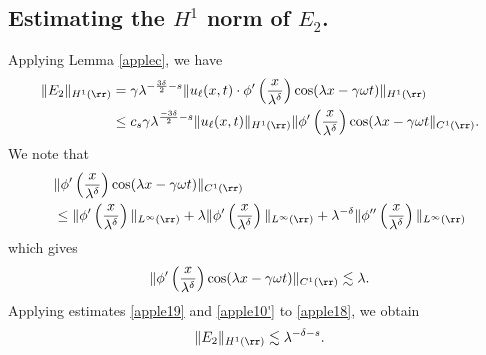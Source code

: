 \subsection{Estimating the $H^1$ norm of $\hyperref[all_errors_together]{E_2}$.} Applying Lemma \ref{applec}, we have
\begin{equation}
	\begin{split}
		\|E_2\|_{H^1(\rr)} 
		& = \gamma \lambda^{-\frac{3 \delta}{2} -s } \|u_\ell(x,t) \cdot
		\phi'\left( \frac{x}{\lambda^\delta} \right) \cos (\lambda x - \gamma \omega t)
		\|_{H^1(\rr)}
		\\
		& \le c_s \gamma \lambda^{\frac{-3 \delta}{2} -s } \|u_\ell(x,t) \|_{H^1(\rr)}
		\|\phi'\left( \frac{x}{\lambda^\delta} \right )
		\cos(\lambda x - \gamma \omega t 
		\|_{C^1(\rr)}.
		\label{apple18}
	\end{split}
\end{equation}
We note that
\begin{equation*}
	\begin{split}
		& \|\phi'\left( \frac{x}{\lambda^\delta} \right) \cos(\lambda x - \gamma \omega t)
		\|_{C^1(\rr)}
		\\
		& \le \|\phi' \left( \frac{x}{\lambda^\delta} \right)\|_{L^\infty(\rr)} +
		\lambda \|\phi'\left( \frac{x}{\lambda^\delta} \right)\|_{L^\infty(\rr)}
		+ \lambda^{-\delta} \|\phi''\left( \frac{x}{\lambda^\delta} \right)
		\|_{L^\infty(\rr)}
	\end{split}
\end{equation*}
which gives
\begin{equation}
	\begin{split}
		\|\phi'\left( \frac{x}{\lambda^\delta} \right) \cos(\lambda x - \gamma \omega t)
		\|_{C^1(\rr)} \lesssim \lambda.
		\label{apple19}
	\end{split}
\end{equation}
Applying estimates \eqref{apple19} and \eqref{apple10'} to \eqref{apple18}, we obtain
\begin{equation*}
	\begin{split}
	\label{apple20}
	\|E_2\|_{H^1(\rr)} \lesssim \lambda^{-\delta -s }.
\end{split}
\end{equation*}
%
%
%
%
